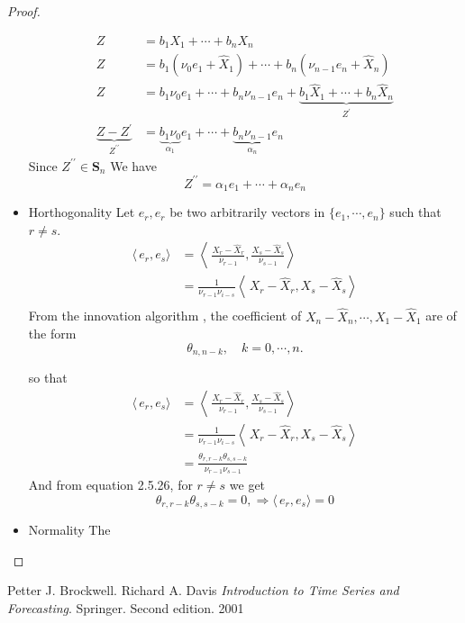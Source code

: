 \documentclass[11pt, oneside]{article}   	%
\begin{document}
\begin{proof}
\begin{itemize}
\begin{equation}
\begin{split}
Z &= b_{1}X_{1} + \cdots + b_{n}X_{n}\\
Z&=b_{1}(\nu_{0}e_{1} + \hat{X}_{1}) + \cdots + b_{n}(\nu_{n-1}e_{n} + \hat{X}_{n})\\
Z&=b_{1}\nu_{0}e_{1}  + \cdots + b_{n}\nu_{n-1}e_{n} + \underbrace{b_{1}\hat{X}_{1} + \cdots + b_{n}\hat{X}_{n}}_{Z^{\prime}}\\
\underbrace{Z-Z^{\prime}}_{Z^{\prime\prime}}&=\underbrace{b_{1}\nu_{0}}_{\alpha_{1}}e_{1}  + \cdots + \underbrace{b_{n}\nu_{n-1}}_{\alpha_{n}}e_{n} 
\end{split}
\end{equation} 
Since $Z^{\prime\prime} \in \textbf{S}_{n}$
We have 
\begin{equation}
Z^{\prime\prime} = \alpha_{1}e_{1}  + \cdots + \alpha_{n}e_{n} 
\end{equation}

\item Horthogonality
Let $e_{r}, e_{r}$ be two arbitrarily vectors in $\{ e_{1}, \cdots, e_{n}   \}$ such that $r \neq s$.
\begin{equation}
\begin{split}
\langle\,e_{r},e_{s}\rangle & = \left\langle\,\frac{X_{r}-\hat{X}_{r}}{\nu_{r-1}} ,\frac{X_{s}-\hat{X}_{s}}{\nu_{s-1}}\right\rangle\\
&=\frac{1}{\nu_{r-1}\nu_{i-s}}\left\langle\,X_{r}-\hat{X}_{r} ,X_{s}-\hat{X}_{s}\right\rangle\\
\end{split}
\end{equation}
From the innovation algorithm \cite{petter}, the coefficient of $X_{n}-\hat{X}_{n}, \cdots, X_{1}-\hat{X}_{1}$ are of the form 
\begin{equation}
\theta_{n,n-k}, \quad k=0, \cdots, n.
\end{equation}

so that 
\begin{equation}
\begin{split}
\langle\,e_{r},e_{s}\rangle & = \left\langle\,\frac{X_{r}-\hat{X}_{r}}{\nu_{r-1}} ,\frac{X_{s}-\hat{X}_{s}}{\nu_{s-1}}\right\rangle\\
&=\frac{1}{\nu_{r-1}\nu_{i-s}}\left\langle\,X_{r}-\hat{X}_{r} ,X_{s}-\hat{X}_{s}\right\rangle\\
&= \frac{\theta_{r,r-k} \theta_{s,s-k}}{\nu_{r-1}\nu_{s-1}}
\end{split}
\end{equation}
And from \cite{petter} equation 2.5.26, for $r\neq s$ we get 
\begin{equation}
\theta_{r,r-k} \theta_{s,s-k} = 0, \Rightarrow \langle\,e_{r},e_{s}\rangle = 0
\end{equation}

\item Normality
The






\end{itemize}
\end{proof}

\begin{thebibliography}{9}
Petter J. Brockwell. Richard A. Davis
\textit{Introduction to Time Series and Forecasting}. 
Springer. Second edition. 2001
 
\end{thebibliography}
\end{document}

